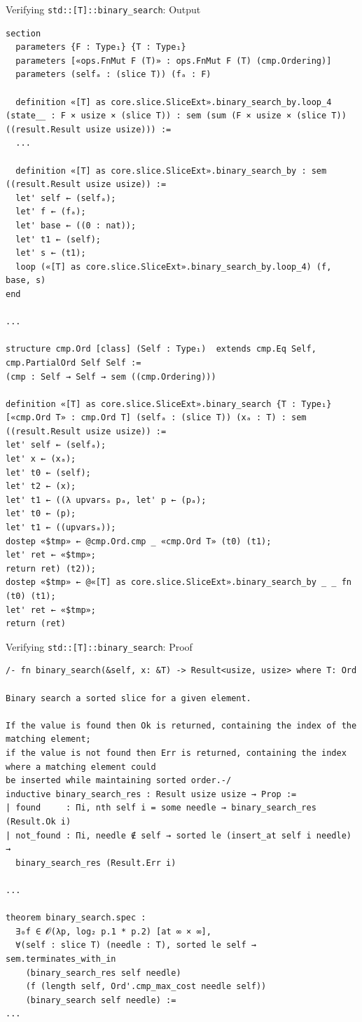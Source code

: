 \documentclass{beamer}
\begin{document}
\begin{frame}[fragile]{Verifying \texttt{std::[T]::binary\_search}: Output}
  \begin{verbatim}
section
  parameters {F : Type₁} {T : Type₁}
  parameters [«ops.FnMut F (T)» : ops.FnMut F (T) (cmp.Ordering)]
  parameters (selfₐ : (slice T)) (fₐ : F)

  definition «[T] as core.slice.SliceExt».binary_search_by.loop_4 (state__ : F × usize × (slice T)) : sem (sum (F × usize × (slice T)) ((result.Result usize usize))) :=
  ...

  definition «[T] as core.slice.SliceExt».binary_search_by : sem ((result.Result usize usize)) :=
  let' self ← (selfₐ);
  let' f ← (fₐ);
  let' base ← ((0 : nat));
  let' t1 ← (self);
  let' s ← (t1);
  loop («[T] as core.slice.SliceExt».binary_search_by.loop_4) (f, base, s)
end

...

structure cmp.Ord [class] (Self : Type₁)  extends cmp.Eq Self, cmp.PartialOrd Self Self :=
(cmp : Self → Self → sem ((cmp.Ordering)))

definition «[T] as core.slice.SliceExt».binary_search {T : Type₁} [«cmp.Ord T» : cmp.Ord T] (selfₐ : (slice T)) (xₐ : T) : sem ((result.Result usize usize)) :=
let' self ← (selfₐ);
let' x ← (xₐ);
let' t0 ← (self);
let' t2 ← (x);
let' t1 ← ((λ upvarsₐ pₐ, let' p ← (pₐ);
let' t0 ← (p);
let' t1 ← ((upvarsₐ));
dostep «$tmp» ← @cmp.Ord.cmp _ «cmp.Ord T» (t0) (t1);
let' ret ← «$tmp»;
return ret) (t2));
dostep «$tmp» ← @«[T] as core.slice.SliceExt».binary_search_by _ _ fn (t0) (t1);
let' ret ← «$tmp»;
return (ret)
  \end{verbatim}
\end{frame}

\begin{frame}[fragile]{Verifying \texttt{std::[T]::binary\_search}: Proof}
  \begin{verbatim}
/- fn binary_search(&self, x: &T) -> Result<usize, usize> where T: Ord

Binary search a sorted slice for a given element.

If the value is found then Ok is returned, containing the index of the matching element;
if the value is not found then Err is returned, containing the index where a matching element could
be inserted while maintaining sorted order.-/
inductive binary_search_res : Result usize usize → Prop :=
| found     : Πi, nth self i = some needle → binary_search_res (Result.Ok i)
| not_found : Πi, needle ∉ self → sorted le (insert_at self i needle) →
  binary_search_res (Result.Err i)

...

theorem binary_search.spec :
  ∃₀f ∈ 𝓞(λp, log₂ p.1 * p.2) [at ∞ × ∞],
  ∀(self : slice T) (needle : T), sorted le self → sem.terminates_with_in
    (binary_search_res self needle)
    (f (length self, Ord'.cmp_max_cost needle self))
    (binary_search self needle) :=
...
  \end{verbatim} 
\end{frame}
\end{document}
